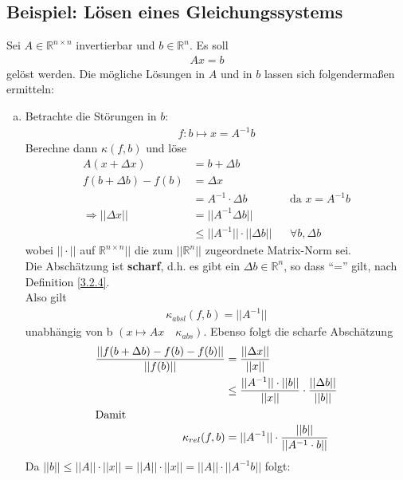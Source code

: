 \documentclass[ngerman,fontsize=11pt, paper=a4, parskip=false, titlepage=false, toc=bib]{scrbook}
\newcommand{\R}{\mathbb{R}}
\begin{document}
\subsection{Beispiel: Lösen eines Gleichungssystems}
Sei $A\in \R^{n\times n}$ invertierbar und $b\in \R^n$. Es soll 
\begin{gather*}
	Ax =b
\end{gather*}
gelöst werden.
Die mögliche Lösungen in $A$ und in $b$ lassen sich folgendermaßen ermitteln:
\begin{enumerate}[a)]
	\item Betrachte die Störungen in $b$:
			\begin{gather*}
			f: b\mapsto x= A^{-1}b 
			\end{gather*}
			Berechne dann $ \kappa(f,b)$ und löse 
			\begin{align*}
					A(x + \Delta x) &= b+\Delta b \\
					f(b + \Delta b) - f(b) &= \Delta x \\
													&= A^{-1} \cdot \Delta b && \text{da }x = A^{-1}b \\
					\Rightarrow ||\Delta x||  &= ||A^{-1}\Delta b|| \\
														&\leq ||A^{-1}||\cdot ||\Delta b|| && \forall b, \Delta b 
			\end{align*}
			wobei $||\cdot|| $ auf $\R^{n\times n}||$ die zum $||\R^n||$ zugeordnete Matrix-Norm sei. \\
			Die Abschätzung ist \textbf{scharf}, d.h. es gibt ein $\Delta b\in \R^n$, so dass \enquote{=} gilt, nach Definition \ref{3.2.4}. \\
			Also gilt
			\begin{gather}
				\kappa_{absl}(f,b) = ||A^{-1}|| \label{II.2.4}
			\end{gather}
			unabhängig von b $\left( x\mapsto Ax \quad \kappa_{abs}\right)$.
			Ebenso folgt die scharfe Abschätzung 
			\begin{align}
				\nonumber
				\frac{||	f(b + \Delta b) - f(b) - f(b)||}{||f(b)||} &= \frac{||\Delta x||}{||x||}\\ \nonumber
						& \leq  \frac{||A^{-1}||\cdot ||b||}{||x||} \cdot \frac{||\Delta b||}{||b||} \\
				\intertext{Damit}
				\kappa_{rel} (f,b) &= ||A^{-1} || \cdot \frac{||b||}{||A^{-1}\cdot b||} \label{III.2.7}
			\end{align}
			Da $||b|| \leq ||A||\cdot||x|| = ||A||\cdot||x|| = ||A||\cdot ||A^{-1}b||$ folgt:
			\begin{gather}

\end{gather}
\end{enumerate}
\end{document}
